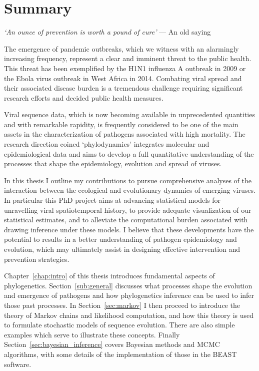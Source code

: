 
\chapter*{Summary}

\bigskip{}

\emph{`An ounce of prevention is worth a pound  of cure'}
--- An old saying

\bigskip{}

The emergence of pandemic outbreaks, which we witness with an alarmingly increasing frequency, represent a clear and imminent threat to the public health. 
This threat has been exemplified by the H1N1 influenza A outbreak in 2009 or the Ebola virus outbreak in West Africa in 2014.
Combating viral spread and their associated disease burden is a tremendous challenge requiring significant research efforts and decided public health measures. 

Viral sequence data, which is now becoming available in unprecedented quantities and with remarkable rapidity, is frequently considered to be one of the main assets in the characterization of pathogens associated with high mortality. 
The research direction coined `phylodynamics' integrates molecular and epidemiological data and aims to develop a full quantitative understanding  of the processes that shape the epidemiology, evolution and spread of viruses.

In this thesis I outline my contributions to pursue comprehensive analyses of the interaction between the ecological and evolutionary dynamics of emerging viruses.
In particular this PhD project aims at advancing statistical models for unravelling viral spatiotemporal history, to provide adequate visualization of our statistical estimates, and to alleviate the computational burden associated with drawing inference under these models.
I believe that these developments have the potential to results in a better understanding of pathogen epidemiology and evolution, which may ultimately assist in designing effective intervention and prevention strategies. 

Chapter~\ref{chap:intro} of this thesis introduces fundamental aspects of phylogenetics.
Section~\ref{sub:general} discusses what processes shape the evolution and emergence of pathogens and how phylogenetics inference can be used to infer those past processes.
In Section~\ref{sec:markov} I then proceed to introduce the theory of Markov chains and likelihood computation, and how this theory is used to formulate stochastic models of sequence evolution. 
There are also simple examples which serve to illustrate these concepts.
Finally Section~\ref{sec:bayesian_inference} covers Bayesian methods and MCMC algorithms, with some details of the implementation of those in the BEAST software.

